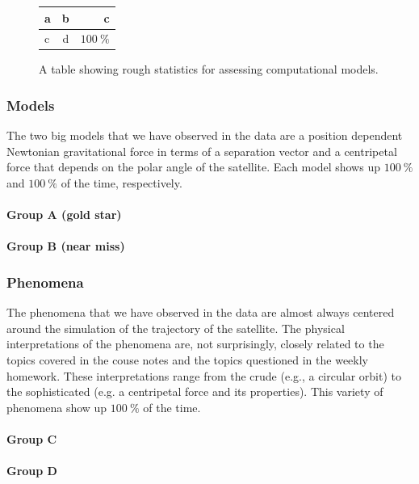 \documentclass{msuphddissertation}
\begin{document}
\begin{doublespace}
\begin{figure}[ht]\centering
\begin{tabular}{l|c|r}
a & b & c \\\hline
c & d & $\SI{100}{\percent}$ \\
\end{tabular}
\caption{A table showing rough statistics for assessing computational models.}
\end{figure}

\subsubsection{Models}

The two big models that we have observed in the data are a position dependent Newtonian gravitational force in terms of a separation vector and a centripetal force that depends on the polar angle of the satellite.  Each model shows up $\SI{100}{\percent}$ and $\SI{100}{\percent}$ of the time, respectively.

\paragraph{Group A (gold star)}

\paragraph{Group B (near miss)}

\subsubsection{Phenomena}

The phenomena that we have observed in the data are almost always centered around the simulation of the trajectory of the satellite.  The physical interpretations of the phenomena are, not surprisingly, closely related to the topics covered in the couse notes and the topics questioned in the weekly homework.  These interpretations range from the crude (e.g., a circular orbit) to the sophisticated (e.g. a centripetal force and its properties).  This variety of phenomena show up $\SI{100}{\percent}$ of the time.

\paragraph{Group C}

\paragraph{Group D}


\end{doublespace}
\end{document}
